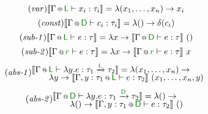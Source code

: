 \begin{figure}
\begin{equation}
\tag{\emph{var}}
\sem{\coctx{\Gamma}{\cclrd{ \ident{L} }} \vdash x_i : \tau_i} = \lambda (x_1, \ldots, x_n) \rightarrow x_i
\end{equation}
\vspace{-1.75em}
\begin{equation}
\tag{\emph{const}}
\sem{\coctx{\Gamma}{\cclrd{ \ident{D} }} \vdash c_i : \tau_i} = \lambda () \rightarrow \delta(c_i)
\end{equation}
%
%
\vspace{-0.5em}
%
%
\begin{equation}
\tag{\emph{sub-1}}
\sem{\coctx{\Gamma}{\cclrd{\ident{L} }} \vdash e : \tau} = \lambda x \rightarrow 
  \sem{\coctx{\Gamma}{\cclrd{\ident{D} }} \vdash e : \tau}~()
\end{equation}
\vspace{-1.75em}
\begin{equation}
\tag{\emph{sub-2}}
\sem{\coctx{\Gamma}{\cclrd{r}} \vdash e : \tau} = \lambda x \rightarrow 
  \sem{\coctx{\Gamma}{\cclrd{r}} \vdash e : \tau}~x
\end{equation}
%
%
\vspace{-0.5em}
%
%
\begin{equation}
\tag{\emph{abs-1}}
\hspace{-0.5em}
\begin{array}{l}
  \sem{\coctx{\Gamma}{\cclrd{\ident{L}}} \vdash \lambda y. e : \tau_1 \xrightarrow{\cclrd{\ident{L}}} \tau_2 } = \lambda (x_1, \ldots, x_n) \rightarrow\\[-0.25em]
  \qquad\lambda y \rightarrow \sem{ \coctx{\Gamma,y:\tau_1}{\cclrd{\ident{L}}} \vdash e : \tau_2 }~(x_1, \ldots, x_n, y)     
\end{array}
\end{equation}
\vspace{-1.0em}
\begin{equation}
\tag{\emph{abs-2}}
\hspace{-0.5em}
\begin{array}{l}
  \sem{\coctx{\Gamma}{\cclrd{\ident{D}}} \vdash \lambda y. e : \tau_1 \xrightarrow{\cclrd{\ident{D}}} \tau_2 } = \lambda () \rightarrow\\[-0.25em]
  \qquad\lambda () \rightarrow \sem{ \coctx{\Gamma,y:\tau_1}{\cclrd{\ident{D}}} \vdash e : \tau_2 }~()
\end{array}
\end{equation}
%
%
\vspace{0.0em}

\end{figure}
